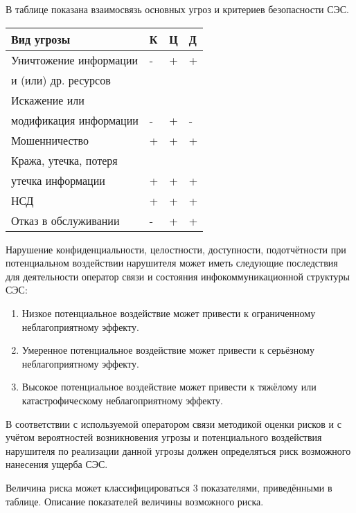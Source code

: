 \documentclass[12pt, russian, oneside, article]{ncc}
\begin{document}
В таблице показана взаимосвязь основных угроз и критериев безопасности СЭС.



\begin{center}
\begin{tabular}{llll}
 Вид угрозы              &  К  &  Ц  &  Д  \\
\hline
 Уничтожение информации  &  -  &  +  &  +  \\
 и (или) др. ресурсов    &     &     &     \\
\hline
 Искажение или           &     &     &     \\
 модификация информации  &  -  &  +  &  -  \\
\hline
 Мошенничество           &  +  &  +  &  +  \\
\hline
 Кража, утечка, потеря   &     &     &     \\
 утечка информации       &  +  &  +  &  +  \\
\hline
 НСД                     &  +  &  +  &  +  \\
\hline
 Отказ в обслуживании    &  -  &  +  &  +  \\
\end{tabular}
\end{center}



Нарушение конфиденциальности, целостности, доступности, подотчётности при потенциальном воздействии нарушителя может иметь следующие последствия для деятельности оператор связи и состояния инфокоммуникационной структуры СЭС:
\begin{enumerate}
\item Низкое потенциальное воздействие может привести к ограниченному неблагоприятному эффекту.
\item Умеренное потенциальное воздействие может привести к серьёзному неблагоприятному эффекту.
\item Высокое потенциальное воздействие может привести к тяжёлому или катастрофическому неблагоприятному эффекту.
\end{enumerate}

В соответствии с используемой оператором связи методикой оценки рисков и с учётом вероятностей возникновения угрозы и потенциального воздействия нарушителя по реализации данной угрозы должен определяться риск возможного нанесения ущерба СЭС.

Величина риска может классифицироваться 3 показателями, приведёнными в таблице. Описание показателей величины возможного риска. 
\end{document}
